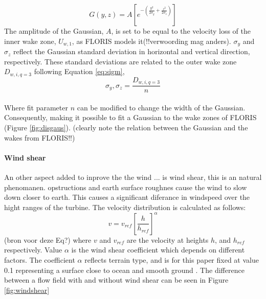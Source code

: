 \begin{equation}
\label{eq:gaus}
G(y, z) = A [e^{-(\frac{y^2}{2\sigma_y} + \frac{z^2}{2\sigma_z})}]
\end{equation}
The amplitude of the Gaussian, $A$, is set to be equal to the velocity loss of the inner wake zone, $U_{w,1}$, as FLORIS models it(!!verwoording mag anders). $\sigma_y$ and $\sigma_z$ reflect the Gaussian standard deviation in horizontal and vertical direction, respectively. These standard deviations are related to the outer wake zone $D_{w,i,q=3}$ following Equation \ref{eq:sigm},
\begin{equation}
\label{eq:sigm}
\sigma_y,\sigma_z = \frac{D_{w,i,q=3}}{n} 
\end{equation}
\\
Where fit parameter $n$ can be modified to change the width of the Gaussian. Consequently, making it possible to fit a Gaussian to the wake zones of FLORIS (Figure \ref{fig:disgaus}).
(clearly note the relation between the Gaussian and the wakes from FLORIS!!)

\paragraph{Wind shear} \label{sec:windshear}
An other aspect added to inprove the the wind ... is wind shear, this is an natural phenomanen. opstructions and earth surface roughnes cause the wind to slow down closer to earth. This causes a significant diferance in windspeed over the hight ranges of the turbine\cite{Firtin2011}.  The velocity distribution is calculated as follows: 
\begin{equation}
\label{eq:shear}
v = v_{ref} \left[\frac{h}{h_{ref}}\right]^\alpha
\end{equation}
(bron voor deze Eq?)
where $v$ and $v_{ref}$ are the velocity at heights $h$, and $h_{ref}$  respectively. Value $\alpha$ is the wind shear coefficient which depends on different factors. The coefficient $\alpha$  reflects terrain type, and is for this paper fixed at value 0.1 representing a surface close to ocean and smooth ground \cite{Firtin2011}. The difference between a flow field with and without wind shear can be seen in Figure \ref{fig:windshear}

